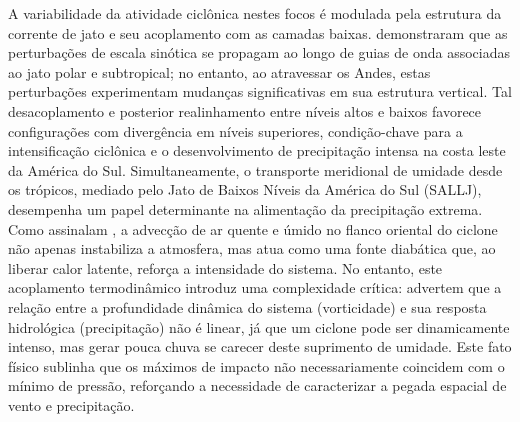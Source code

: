 A variabilidade da atividade ciclônica nestes focos é modulada pela estrutura da corrente de jato e seu acoplamento com as camadas baixas. \citet{vera2002cold} demonstraram que as perturbações de escala sinótica se propagam ao longo de guias de onda associadas ao jato polar e subtropical; no entanto, ao atravessar os Andes, estas perturbações experimentam mudanças significativas em sua estrutura vertical. Tal desacoplamento e posterior realinhamento entre níveis altos e baixos favorece configurações com divergência em níveis superiores, condição-chave para a intensificação ciclônica e o desenvolvimento de precipitação intensa na costa leste da América do Sul.
Simultaneamente, o transporte meridional de umidade desde os trópicos, mediado pelo Jato de Baixos Níveis da América do Sul (SALLJ), desempenha um papel determinante na alimentação da precipitação extrema. Como assinalam \citet{reboita2022from}, a advecção de ar quente e úmido no flanco oriental do ciclone não apenas instabiliza a atmosfera, mas atua como uma fonte diabática que, ao liberar calor latente, reforça a intensidade do sistema.
No entanto, este acoplamento termodinâmico introduz uma complexidade crítica: \citet{sinclair2023relationship} advertem que a relação entre a profundidade dinâmica do sistema (vorticidade) e sua resposta hidrológica (precipitação) não é linear, já que um ciclone pode ser dinamicamente intenso, mas gerar pouca chuva se carecer deste suprimento de umidade. Este fato físico sublinha que os máximos de impacto não necessariamente coincidem com o mínimo de pressão, reforçando a necessidade de caracterizar a pegada espacial de vento e precipitação.

